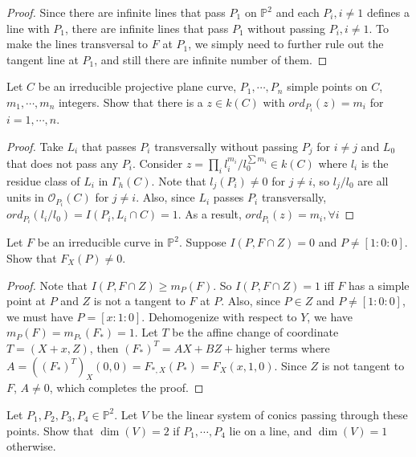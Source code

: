 \documentclass{solution}
\begin{document}
\begin{proof}
    Since there are infinite lines that pass $P_1$ on $\mathbb{P}^2$ and each $P_i, i \ne 1$ defines a line with $P_1$, there are infinite lines that pass $P_1$ without passing $P_i, i \ne 1$. To make the lines transversal to $F$ at $P_1$, we simply need to further rule out the tangent line at $P_1$, and still there are infinite number of them.
\end{proof}

\begin{problem}{5.15}
    Let $C$ be an irreducible projective plane curve, $P_1, \cdots, P_n$ simple points on $C$, $m_1, \cdots, m_n$ integers. Show that there is a $z \in k(C)$ with $ord_{P_i}(z) = m_i$ for $i = 1, \cdots, n$.
\end{problem}

\begin{proof}
    Take $L_i$ that passes $P_i$ transversally without passing $P_j$ for $i \ne j$ and $L_0$ that does not pass any $P_i$. Consider $z = \prod\limits_{i}l_i^{m_i} / l_0^{\sum m_i} \in k(C)$ where $l_i$ is the residue class of $L_i$ in $\Gamma_h(C)$. Note that $l_j(P_i) \ne 0$ for $j \ne i$, so $l_j / l_0$ are all units in $\mathcal{O}_{P_i}(C)$ for $j \ne i$. Also, since $L_i$ passes $P_i$ transversally, $ord_{P_i}(l_i / l_0) = I(P_i, L_i \cap C) = 1$. As a result, $ord_{P_i}(z) = m_i, \forall i$
\end{proof}

\begin{problem}{5.16}
    Let $F$ be an irreducible curve in $\mathbb{P}^2$. Suppose $I(P, F \cap Z) = 0$ and $P \ne [1:0:0]$. Show that $F_X(P) \ne 0$.
\end{problem}

\begin{proof}
    Note that $I(P, F \cap Z) \ge m_P(F)$. So $I(P, F \cap Z) = 1$ iff $F$ has a simple point at $P$ and $Z$ is not a tangent to $F$ at $P$. Also, since $P \in Z$ and $P \ne [1:0:0]$, we must have $P = [x:1:0]$. Dehomogenize with respect to $Y$, we have $m_P(F) = m_{P_*}(F_*) = 1$. Let $T$ be the affine change of coordinate $T = (X + x, Z)$, then $(F_*)^T = AX + BZ + \text{higher terms}$ where $A = ((F_*)^T)_X(0, 0) = F_{*, X}(P_*) = F_X(x, 1, 0)$. Since $Z$ is not tangent to $F$, $A \ne 0$, which completes the proof.
\end{proof}

\begin{problem}{5.17}
    Let $P_1, P_2, P_3, P_4 \in \mathbb{P}^2$. Let $V$ be the linear system of conics passing through these points. Show that $\dim (V) = 2$ if $P_1, \cdots, P_4$ lie on a line, and $\dim(V) = 1$ otherwise.
\end{problem}
\end{document}
